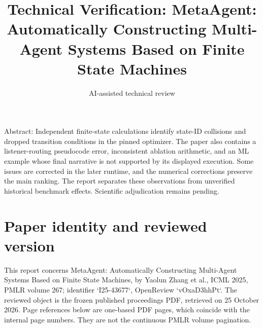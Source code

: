 \documentclass[10pt]{article}
\title{Technical Verification: MetaAgent: Automatically Constructing Multi-Agent Systems Based on Finite State Machines}
\author{AI-assisted technical review}
\date{}
\begin{document}
\maketitle
Abstract: Independent finite-state calculations identify state-ID collisions and dropped transition conditions in the pinned optimizer. The paper also contains a listener-routing pseudocode error, inconsistent ablation arithmetic, and an ML example whose final narrative is not supported by its displayed execution. Some issues are corrected in the later runtime, and the numerical corrections preserve the main ranking. The report separates these observations from unverified historical benchmark effects. Scientific adjudication remains pending.\par
\section*{Paper identity and reviewed version}
This report concerns MetaAgent: Automatically Constructing Multi-Agent Systems Based on Finite State Machines, by Yaolun Zhang et al., ICML 2025, PMLR volume 267; identifier `I25-43677`, OpenReview `vOxaD3hhPt`. The reviewed object is the frozen published proceedings PDF, retrieved on 25 October 2026. Page references below are one-based PDF pages, which coincide with the internal page numbers. They are not the continuous PMLR volume pagination.\par
\end{document}
